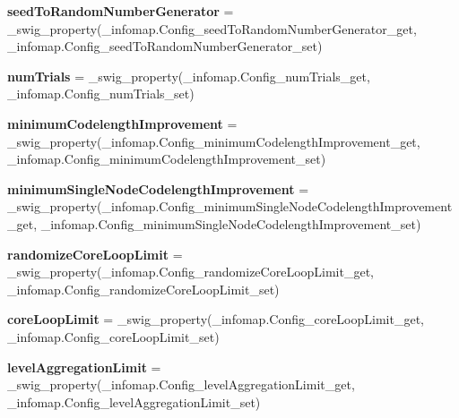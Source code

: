 \begin{DoxyCompactItemize}
\item 
\mbox{\label{classinfomap_1_1Config_abce57c3fddb786e2c3ce2ef510e60a3f}} 
{\bfseries seed\+To\+Random\+Number\+Generator} = \+\_\+swig\+\_\+property(\+\_\+infomap.\+Config\+\_\+seed\+To\+Random\+Number\+Generator\+\_\+get, \+\_\+infomap.\+Config\+\_\+seed\+To\+Random\+Number\+Generator\+\_\+set)
\item 
\mbox{\label{classinfomap_1_1Config_a7e80c8eed927c442ed95aa5dd4c993f2}} 
{\bfseries num\+Trials} = \+\_\+swig\+\_\+property(\+\_\+infomap.\+Config\+\_\+num\+Trials\+\_\+get, \+\_\+infomap.\+Config\+\_\+num\+Trials\+\_\+set)
\item 
\mbox{\label{classinfomap_1_1Config_a02dff0b23e5c767ff8bf3bba82976cab}} 
{\bfseries minimum\+Codelength\+Improvement} = \+\_\+swig\+\_\+property(\+\_\+infomap.\+Config\+\_\+minimum\+Codelength\+Improvement\+\_\+get, \+\_\+infomap.\+Config\+\_\+minimum\+Codelength\+Improvement\+\_\+set)
\item 
\mbox{\label{classinfomap_1_1Config_a396ee1908174641665acecbc236d3dec}} 
{\bfseries minimum\+Single\+Node\+Codelength\+Improvement} = \+\_\+swig\+\_\+property(\+\_\+infomap.\+Config\+\_\+minimum\+Single\+Node\+Codelength\+Improvement\+\_\+get, \+\_\+infomap.\+Config\+\_\+minimum\+Single\+Node\+Codelength\+Improvement\+\_\+set)
\item 
\mbox{\label{classinfomap_1_1Config_a5eec1c6a99e071dfab2b472001856965}} 
{\bfseries randomize\+Core\+Loop\+Limit} = \+\_\+swig\+\_\+property(\+\_\+infomap.\+Config\+\_\+randomize\+Core\+Loop\+Limit\+\_\+get, \+\_\+infomap.\+Config\+\_\+randomize\+Core\+Loop\+Limit\+\_\+set)
\item 
\mbox{\label{classinfomap_1_1Config_a243037c976afdcaeaf61eddc4c9b9f1e}} 
{\bfseries core\+Loop\+Limit} = \+\_\+swig\+\_\+property(\+\_\+infomap.\+Config\+\_\+core\+Loop\+Limit\+\_\+get, \+\_\+infomap.\+Config\+\_\+core\+Loop\+Limit\+\_\+set)
\item 
\mbox{\label{classinfomap_1_1Config_a45897901a4cda8f49f256601ed36a3dc}} 
{\bfseries level\+Aggregation\+Limit} = \+\_\+swig\+\_\+property(\+\_\+infomap.\+Config\+\_\+level\+Aggregation\+Limit\+\_\+get, \+\_\+infomap.\+Config\+\_\+level\+Aggregation\+Limit\+\_\+set)

\end{DoxyCompactItemize}

